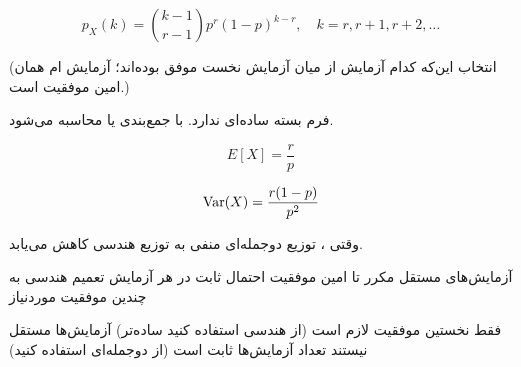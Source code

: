 
\[p_X(k) = \binom{k-1}{r-1} p^r (1-p)^{k-r}, \quad k = r, r+1, r+2, \ldots\]

(انتخاب این‌که کدام  آزمایش از میان  آزمایش نخست موفق بوده‌اند؛ آزمایش ام همان امین موفقیت است.)


فرم بسته ساده‌ای ندارد. با جمع‌بندی یا  محاسبه می‌شود.


\[E[X] = \frac{r}{p}\]


\[\text{Var}(X) = \frac{r(1-p)}{p^2}\]


وقتی ، توزیع دوجمله‌ای منفی به توزیع هندسی کاهش می‌یابد.


\lr{\PSyes{}} آزمایش‌های مستقل مکرر تا امین موفقیت\PSbr{}\lr{\PSyes{}} احتمال ثابت در هر آزمایش\PSbr{}\lr{\PSyes{}} تعمیم هندسی به چندین موفقیت موردنیاز


\PSno{} فقط نخستین موفقیت لازم است (از هندسی استفاده کنید  ساده‌تر)\PSbr{}\PSno{} آزمایش‌ها مستقل نیستند\PSbr{}\PSno{} تعداد آزمایش‌ها ثابت است (از دوجمله‌ای استفاده کنید)



